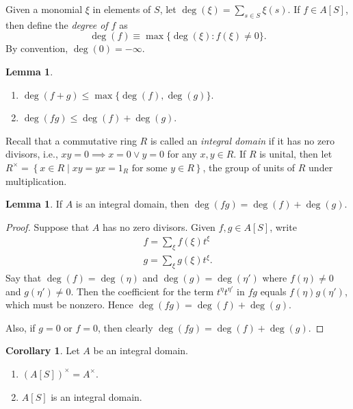 \documentclass[10pt,letterpaper,cm]{nupset}
\theoremstyle{definition}
\theoremstyle{theorem}
\newtheorem{lemma}[definition]{Lemma}
\newtheorem{corollary}[definition]{Corollary}
\theoremstyle{remark}
\newcommand{\1}{\mathbf{1}}
\newcommand{\0}{\vec 0}
\begin{document}
\medskip


Given a monomial $\xi$ in elements of $S$, let $\deg(\xi) = \sum_{s\in S} \xi(s).$ If $f\in A[S]$, then define the \textit{degree of $f$} as $$ \deg(f)  \equiv \max \{ \deg (\xi) : f(\xi) \ne 0\}  .$$ By convention, $\deg(0) = {-\infty}$.


\begin{lemma} $ $ %
\begin{enumerate}
\item $\deg(f+g)\leq \max \{\deg(f), \deg(g)\}$.
\item $\deg(fg) \leq \deg(f) + \deg(g)$.
\end{enumerate}
\end{lemma}

\smallskip

Recall that a commutative ring $R$ is called an \textit{integral domain} if it has no zero divisors, i.e., $xy=0 \implies x=0 \vee y =0$ for any $x,y\in R$. If $R$ is unital, then let $R^{\times} = \left\{x \in R \mid xy =yx = 1_R \text{ for some }y\in R\right\}$, the group of units of $R$ under multiplication.

\begin{lemma}
If $A$ is an integral domain, then $\deg(fg) = \deg(f) + \deg(g)$.
\end{lemma}
\begin{proof}
Suppose that $A$ has no zero divisors. Given $f,g \in A[S]$,  write 
\begin{gather*}
f= \sum_{\xi} f(\xi)t^{\xi}
\\  g= \sum_{\xi} g(\xi)t^{\xi}.
\end{gather*} Say that $\deg(f) = \deg(\eta)$ and $\deg(g) = \deg(\eta')$ where $f(\eta) \ne 0$ and $g(\eta') \ne 0$. Then the coefficient for the term $t^{\eta}t^{\eta'}$ in $fg$ equals $f(\eta)g(\eta')$, which must be nonzero. Hence $\deg(fg) = \deg(f) + \deg(g)$. 

Also, if $g=0$ or $f=0$, then clearly $\deg(fg) = \deg(f) + \deg(g)$.
\end{proof}

\begin{corollary}
Let $A$ be an integral domain. 
\begin{enumerate}
\item $\left(A[S]\right)^{\times} =A^{\times}$.
\item $A[S]$ is an integral domain.
\end{enumerate}
\end{corollary}
\end{document}
